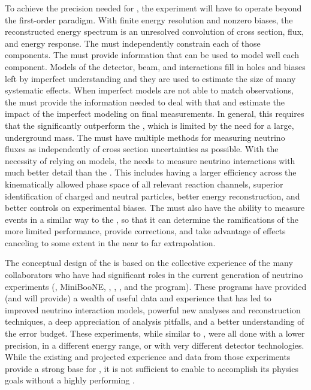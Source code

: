 To achieve the precision needed for , the experiment will have to operate beyond the first-order paradigm. With finite energy resolution and nonzero biases, the reconstructed energy spectrum is an unresolved convolution of cross section, flux, and energy response. The  must independently constrain each of those components.  The  must provide information that can be used to model well each component. Models of the detector, beam, and interactions fill in holes and biases left by imperfect understanding and they are used to estimate the size of many systematic effects.  When imperfect models are not able to match observations, the  must provide the information needed to deal with that and estimate the impact of the imperfect modeling on final measurements. In general, this requires that the  significantly outperform the , which is limited by the need for a large, underground mass. The  must have multiple methods for measuring neutrino fluxes as independently of cross section uncertainties as possible. With the necessity of relying on models, the  needs to measure neutrino interactions with much better detail than the . This includes having a larger efficiency across the kinematically allowed phase space of all relevant reaction channels, superior identification of charged and neutral particles, better energy reconstruction, and better controls on experimental biases. The  must also have the ability to measure events in a similar way to the , so that it can determine the ramifications of the more limited  performance, provide corrections, and take advantage of effects canceling to some extent in the near to far extrapolation.

The conceptual design of the  is based on the collective experience of the many  collaborators who have had significant roles in the current generation of neutrino experiments (, MiniBooNE, , , , and the  program).  These programs have provided (and will provide) a wealth of useful data and experience that has led to improved neutrino interaction models, powerful new analyses and reconstruction techniques, a deep appreciation of analysis pitfalls, and a better understanding of the error budget. 
These experiments, while similar to , were all %
done with a lower precision, in a different energy range, or with very different detector technologies. While the existing and projected experience and data from those experiments provide a strong base for , it is not sufficient to enable  to accomplish its physics goals without a highly performing .  

